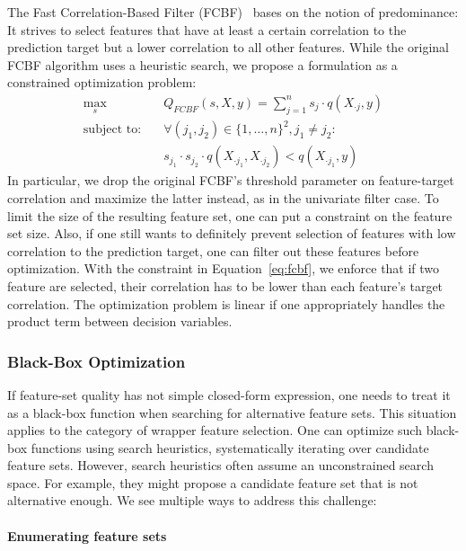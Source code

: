 \documentclass{article}
\theoremstyle{definition}
\begin{document}
The Fast Correlation-Based Filter (FCBF)~\cite{yu2003feature} bases on the notion of predominance:
It strives to select features that have at least a certain correlation to the prediction target but a lower correlation to all other features.
While the original FCBF algorithm uses a heuristic search, we propose a formulation as a constrained optimization problem:
%
\begin{equation}
	\begin{aligned}
		\max_s &\quad Q_{FCBF}(s,X,y) = \sum_{j=1}^{n} s_j \cdot q(X_{\cdot{}j},y) \\
		\text{subject to:} &\quad \forall (j_1,j_2) \in \{1, \dots, n\}^2, j_1 \neq j_2: \\
		&\quad s_{j_1} \cdot s_{j_2} \cdot q(X_{\cdot{}j_1}, X_{\cdot{}j_2}) < q(X_{\cdot{}j_1},y)
	\end{aligned}
	\label{eq:fcbf}
\end{equation}
%
In particular, we drop the original FCBF's threshold parameter on feature-target correlation and maximize the latter instead, as in the univariate filter case.
To limit the size of the resulting feature set, one can put a constraint on the feature set size.
Also, if one still wants to definitely prevent selection of features with low correlation to the prediction target, one can filter out these features before optimization.
With the constraint in Equation~\ref{eq:fcbf}, we enforce that if two feature are selected, their correlation has to be lower than each feature's target correlation.
The optimization problem is linear if one appropriately handles the product term between decision variables.

\subsubsection{Black-Box Optimization}
\label{sec:approach:objectives:black-box}

If feature-set quality has not simple closed-form expression, one needs to treat it as a black-box function when searching for alternative feature sets.
This situation applies to the category of wrapper feature selection.
One can optimize such black-box functions using search heuristics, systematically iterating over candidate feature sets.
However, search heuristics often assume an unconstrained search space.
For example, they might propose a candidate feature set that is not alternative enough.
We see multiple ways to address this challenge:

\paragraph{Enumerating feature sets}
\end{document}
